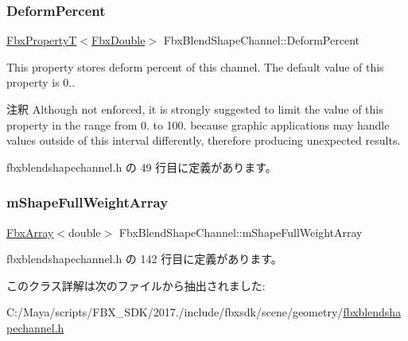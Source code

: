 \subsubsection{\texorpdfstring{Deform\+Percent}{DeformPercent}}
{\footnotesize\ttfamily \hyperlink{class_fbx_property_t}{Fbx\+PropertyT}$<$\hyperlink{fbxtypes_8h_a171e72a1c46fc15c1a6c9c31948c1c5b}{Fbx\+Double}$>$ Fbx\+Blend\+Shape\+Channel\+::\+Deform\+Percent}

This property stores deform percent of this channel. The default value of this property is 0..

\begin{DoxyRemark}{注釈}
Although not enforced, it is strongly suggested to limit the value of this property in the range from 0. to 100. because graphic applications may handle values outside of this interval differently, therefore producing unexpected results. 
\end{DoxyRemark}


 fbxblendshapechannel.\+h の 49 行目に定義があります。

\mbox{\label{class_fbx_blend_shape_channel_a99111b4513741df3e42dd87b1c08d347}} 
\subsubsection{\texorpdfstring{m\+Shape\+Full\+Weight\+Array}{mShapeFullWeightArray}}
{\footnotesize\ttfamily \hyperlink{class_fbx_array}{Fbx\+Array}$<$double$>$ Fbx\+Blend\+Shape\+Channel\+::m\+Shape\+Full\+Weight\+Array\hspace{0.3cm}{\ttfamily [protected]}}



 fbxblendshapechannel.\+h の 142 行目に定義があります。



このクラス詳解は次のファイルから抽出されました\+:\begin{DoxyCompactItemize}
\item 
C\+:/\+Maya/scripts/\+F\+B\+X\+\_\+\+S\+D\+K/2017./include/fbxsdk/scene/geometry/\hyperlink{fbxblendshapechannel_8h}{fbxblendshapechannel.\+h}\end{DoxyCompactItemize}
